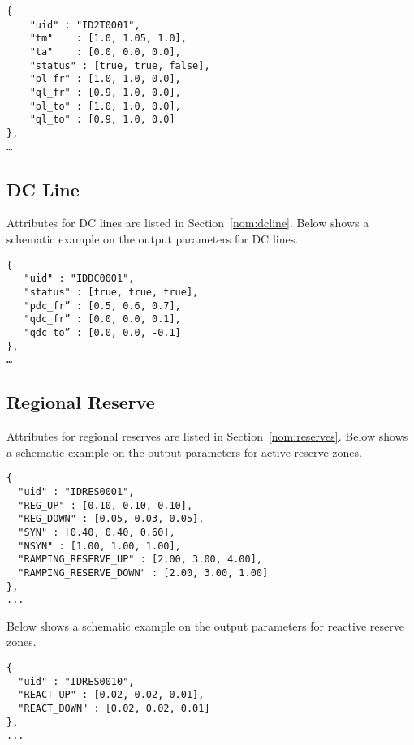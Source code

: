 \begin{verbatim}
{
    "uid" : "ID2T0001",
    "tm"    : [1.0, 1.05, 1.0],
    "ta"    : [0.0, 0.0, 0.0],
    "status" : [true, true, false],
    "pl_fr" : [1.0, 1.0, 0.0],
    "ql_fr" : [0.9, 1.0, 0.0],
    "pl_to" : [1.0, 1.0, 0.0],
    "ql_to" : [0.9, 1.0, 0.0]
},
…     
\end{verbatim}

\subsection{DC Line}
Attributes for DC lines are listed in Section~\ref{nom:dcline}.
Below shows a schematic example on the output parameters for DC lines.
\begin{verbatim}
{
   "uid" : "IDDC0001",
   "status" : [true, true, true],   
   "pdc_fr” : [0.5, 0.6, 0.7],
   "qdc_fr” : [0.0, 0.0, 0.1],
   "qdc_to” : [0.0, 0.0, -0.1]
},
…    
\end{verbatim}



\subsection{Regional Reserve}
Attributes for regional reserves are listed in Section~\ref{nom:reserves}.
Below shows a schematic example on the output parameters for active reserve zones.
\begin{verbatim}
{
  "uid" : "IDRES0001",
  "REG_UP" : [0.10, 0.10, 0.10],
  "REG_DOWN" : [0.05, 0.03, 0.05],
  "SYN" : [0.40, 0.40, 0.60],
  "NSYN" : [1.00, 1.00, 1.00],  
  "RAMPING_RESERVE_UP" : [2.00, 3.00, 4.00],  
  "RAMPING_RESERVE_DOWN" : [2.00, 3.00, 1.00]
},
...
\end{verbatim}

Below shows a schematic example on the output parameters for reactive reserve zones.
\begin{verbatim}
{
  "uid" : "IDRES0010",
  "REACT_UP" : [0.02, 0.02, 0.01],
  "REACT_DOWN" : [0.02, 0.02, 0.01]
},
...
\end{verbatim}

